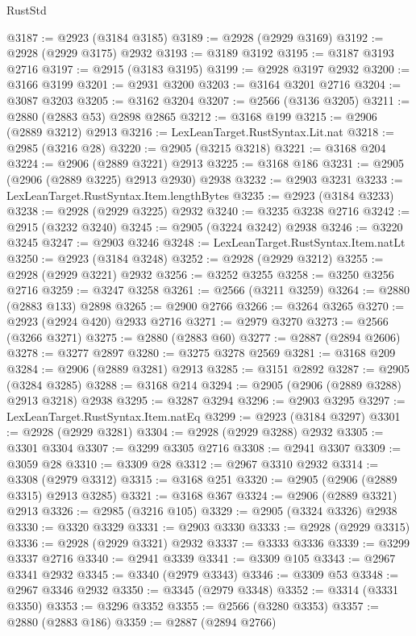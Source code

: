 \begin{lexlean}{RustStd}
\begin{coremodule}
{\begin{coremodule}
{{{{{{{{{{{{{{{{{{{{{{{{{{{{{{{{{{{{{{{{{{{{{{{{{{{{{{{{{{{{{{{{{{{{{{{{{{{{{{@3187 := @2923 (@3184 @3185)
@3189 := @2928 (@2929 @3169)
@3192 := @2928 (@2929 @3175) @2932
@3193 := @3189 @3192
@3195 := @3187 @3193 @2716
@3197 := @2915 (@3183 @3195)
@3199 := @2928 @3197 @2932
@3200 := @3166 @3199
@3201 := @2931 @3200
@3203 := @3164 @3201 @2716
@3204 := @3087 @3203
@3205 := @3162 @3204
@3207 := @2566 (@3136 @3205)
@3211 := @2880 (@2883 @53) @2898 @2865
@3212 := @3168 @199
@3215 := @2906 (@2889 @3212) @2913
@3216 := LexLeanTarget.RustSyntax.Lit.nat
@3218 := @2985 (@3216 @28)
@3220 := @2905 (@3215 @3218)
@3221 := @3168 @204
@3224 := @2906 (@2889 @3221) @2913
@3225 := @3168 @186
@3231 := @2905 (@2906 (@2889 @3225) @2913 @2930) @2938
@3232 := @2903 @3231
@3233 := LexLeanTarget.RustSyntax.Item.lengthBytes
@3235 := @2923 (@3184 @3233)
@3238 := @2928 (@2929 @3225) @2932
@3240 := @3235 @3238 @2716
@3242 := @2915 (@3232 @3240)
@3245 := @2905 (@3224 @3242) @2938
@3246 := @3220 @3245
@3247 := @2903 @3246
@3248 := LexLeanTarget.RustSyntax.Item.natLt
@3250 := @2923 (@3184 @3248)
@3252 := @2928 (@2929 @3212)
@3255 := @2928 (@2929 @3221) @2932
@3256 := @3252 @3255
@3258 := @3250 @3256 @2716
@3259 := @3247 @3258
@3261 := @2566 (@3211 @3259)
@3264 := @2880 (@2883 @133) @2898
@3265 := @2900 @2766
@3266 := @3264 @3265
@3270 := @2923 (@2924 @420) @2933 @2716
@3271 := @2979 @3270
@3273 := @2566 (@3266 @3271)
@3275 := @2880 (@2883 @60)
@3277 := @2887 (@2894 @2606)
@3278 := @3277 @2897
@3280 := @3275 @3278 @2569
@3281 := @3168 @209
@3284 := @2906 (@2889 @3281) @2913
@3285 := @3151 @2892
@3287 := @2905 (@3284 @3285)
@3288 := @3168 @214
@3294 := @2905 (@2906 (@2889 @3288) @2913 @3218) @2938
@3295 := @3287 @3294
@3296 := @2903 @3295
@3297 := LexLeanTarget.RustSyntax.Item.natEq
@3299 := @2923 (@3184 @3297)
@3301 := @2928 (@2929 @3281)
@3304 := @2928 (@2929 @3288) @2932
@3305 := @3301 @3304
@3307 := @3299 @3305 @2716
@3308 := @2941 @3307
@3309 := @3059 @28
@3310 := @3309 @28
@3312 := @2967 @3310 @2932
@3314 := @3308 (@2979 @3312)
@3315 := @3168 @251
@3320 := @2905 (@2906 (@2889 @3315) @2913 @3285)
@3321 := @3168 @367
@3324 := @2906 (@2889 @3321) @2913
@3326 := @2985 (@3216 @105)
@3329 := @2905 (@3324 @3326) @2938
@3330 := @3320 @3329
@3331 := @2903 @3330
@3333 := @2928 (@2929 @3315)
@3336 := @2928 (@2929 @3321) @2932
@3337 := @3333 @3336
@3339 := @3299 @3337 @2716
@3340 := @2941 @3339
@3341 := @3309 @105
@3343 := @2967 @3341 @2932
@3345 := @3340 (@2979 @3343)
@3346 := @3309 @53
@3348 := @2967 @3346 @2932
@3350 := @3345 (@2979 @3348)
@3352 := @3314 (@3331 @3350)
@3353 := @3296 @3352
@3355 := @2566 (@3280 @3353)
@3357 := @2880 (@2883 @186)
@3359 := @2887 (@2894 @2766)
}}}}}}}}}}}}}}}}}}}}}}}}}}}}}}}}}}}}}}}}}}}}}}}}}}}}}}}}}}}}}}}}}}}}}}}}}}}}}}
\end{coremodule}}
\end{coremodule}
\end{lexlean}
